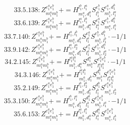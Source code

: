 \documentclass[letterpaper,10pt,fleqn,leqno,onecolumn]{article}
\begin{document}
\begin{equation} \;\;\;\;\;\;  33.5.138: Z^{e_{1}^{a}e_{1}^{b}}_{m_{1}^{a}m_{1}^{b}}+=H^{l_{1}^{b},l_{1}^{a}}_{m_{1}^{a},d_{1}^{b}}S^{e_{1}^{b}}_{l_{1}^{b}}S^{e_{1}^{a},d_{1}^{b}}_{m_{1}^{b},l_{1}^{a}} \end{equation}
\begin{equation} \;\;\;\;\;\;  33.6.139: Z^{e_{1}^{a}e_{1}^{b}}_{m_{1}^{a}m_{1}^{b}}+=H^{l_{1}^{a},l_{1}^{b}}_{m_{1}^{b},d_{1}^{a}}S^{e_{1}^{a}}_{l_{1}^{a}}S^{e_{1}^{b},d_{1}^{a}}_{m_{1}^{a},l_{1}^{b}} \end{equation}
\begin{equation} \;\;\;\;\;\;  33.7.140: Z^{e_{1}^{a}e_{1}^{b}}_{m_{1}^{a}m_{1}^{b}}+=H^{l_{1}^{a},l_{1}^{b}}_{m_{1}^{a},d_{1}^{b}}S^{e_{1}^{a}}_{l_{1}^{a}}S^{e_{1}^{b},d_{1}^{b}}_{m_{1}^{b},l_{1}^{b}}\cdot -1/1 \end{equation}
\begin{equation} \;\;\;\;\;\;  33.9.142: Z^{e_{1}^{a}e_{1}^{b}}_{m_{1}^{a}m_{1}^{b}}+=H^{l_{1}^{a},l_{2}^{a}}_{m_{1}^{a},d_{1}^{a}}S^{e_{1}^{a}}_{l_{1}^{a}}S^{e_{1}^{b},d_{1}^{a}}_{m_{1}^{b},l_{2}^{a}}\cdot -1/1 \end{equation}
\begin{equation} \;\;\;\;\;\;  34.2.145: Z^{e_{1}^{a}e_{1}^{b}}_{m_{1}^{a}m_{1}^{b}}+=H^{l_{1}^{a}l_{1}^{b}}_{m_{1}^{b},d_{1}^{a}}S^{d_{1}^{a}}_{m_{1}^{a}}S^{e_{1}^{a}e_{1}^{b}}_{l_{1}^{a}l_{1}^{b}}\cdot -1/1 \end{equation}
\begin{equation} \;\;\;\;\;\;  34.3.146: Z^{e_{1}^{a}e_{1}^{b}}_{m_{1}^{a}m_{1}^{b}}+=H^{l_{1}^{a}l_{1}^{b}}_{m_{1}^{a},d_{1}^{b}}S^{d_{1}^{b}}_{m_{1}^{b}}S^{e_{1}^{a}e_{1}^{b}}_{l_{1}^{a}l_{1}^{b}} \end{equation}
\begin{equation} \;\;\;\;\;\;  35.2.149: Z^{e_{1}^{a}e_{1}^{b}}_{m_{1}^{a}m_{1}^{b}}+=H^{l_{1}^{b},l_{2}^{b}}_{m_{1}^{b},d_{1}^{b}}S^{d_{1}^{b}}_{l_{1}^{b}}S^{e_{1}^{a}e_{1}^{b}}_{m_{1}^{a},l_{2}^{b}} \end{equation}
\begin{equation} \;\;\;\;\;\;  35.3.150: Z^{e_{1}^{a}e_{1}^{b}}_{m_{1}^{a}m_{1}^{b}}+=H^{l_{1}^{b},l_{1}^{a}}_{m_{1}^{a},d_{1}^{b}}S^{d_{1}^{b}}_{l_{1}^{b}}S^{e_{1}^{a}e_{1}^{b}}_{m_{1}^{b},l_{1}^{a}}\cdot -1/1 \end{equation}
\begin{equation} \;\;\;\;\;\;  35.6.153: Z^{e_{1}^{a}e_{1}^{b}}_{m_{1}^{a}m_{1}^{b}}+=H^{l_{1}^{a},l_{1}^{b}}_{m_{1}^{b},d_{1}^{a}}S^{d_{1}^{a}}_{l_{1}^{a}}S^{e_{1}^{a}e_{1}^{b}}_{m_{1}^{a},l_{1}^{b}} \end{equation}
\end{document}
